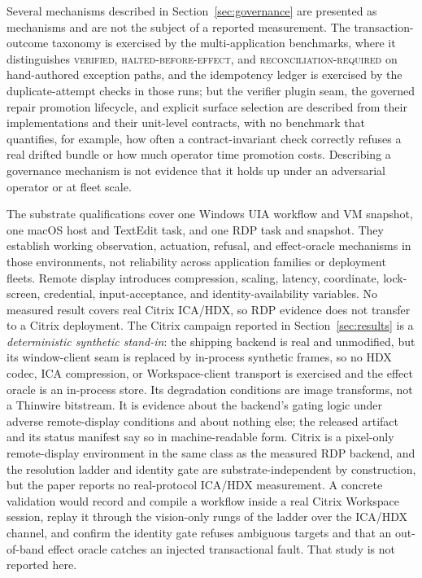 Several mechanisms described in Section~\ref{sec:governance} are presented as
mechanisms and are not the subject of a reported measurement. The
transaction-outcome taxonomy is exercised by the multi-application benchmarks,
where it distinguishes \textsc{verified}, \textsc{halted-before-effect}, and
\textsc{reconciliation-required} on hand-authored exception paths, and the
idempotency ledger is exercised by the duplicate-attempt checks in those runs;
but the verifier plugin seam, the governed repair promotion lifecycle, and
explicit surface selection are described from their implementations and their
unit-level contracts, with no benchmark that quantifies, for example, how often
a contract-invariant check correctly refuses a real drifted bundle or how much
operator time promotion costs. Describing a governance mechanism is not
evidence that it holds up under an adversarial operator or at fleet scale.

The substrate qualifications cover one Windows UIA workflow and VM snapshot,
one macOS host and TextEdit task, and one RDP task and snapshot. They establish
working observation, actuation, refusal, and effect-oracle mechanisms in those
environments, not reliability across application families or deployment fleets.
Remote display introduces compression, scaling, latency, coordinate,
lock-screen, credential, input-acceptance, and identity-availability variables.
No measured result covers real Citrix ICA/HDX, so RDP evidence does not transfer
to a Citrix deployment. The Citrix campaign reported in
Section~\ref{sec:results} is a \emph{deterministic synthetic stand-in}: the
shipping backend is real and unmodified, but its window-client seam is replaced
by in-process synthetic frames, so no HDX codec, ICA compression, or
Workspace-client transport is exercised and the effect oracle is an in-process
store. Its degradation conditions are image transforms, not a Thinwire
bitstream. It is evidence about the backend's gating logic under adverse
remote-display conditions and about nothing else; the released artifact and its
status manifest say so in machine-readable form. Citrix is a pixel-only
remote-display environment in the same
class as the measured RDP backend, and the resolution ladder and identity gate
are substrate-independent by construction, but the paper reports no
real-protocol ICA/HDX
measurement. A concrete validation would record and compile a workflow inside a
real Citrix Workspace session, replay it through the vision-only rungs of the
ladder over the ICA/HDX channel, and confirm the identity gate refuses ambiguous
targets and that an out-of-band effect oracle catches an injected transactional
fault. That study is not reported here.

